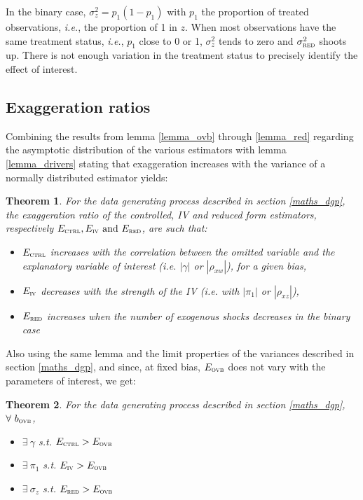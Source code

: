 \documentclass[usletter, 12pt]{article}
\newtheorem{theorem}{Theorem}
\begin{document}
				In the binary case, $\sigma_{z}^{2} = p_{1}(1-p_{1})$ with $p_{1}$ the proportion of treated observations, \textit{i.e.}, the proportion of 1 in $z$. When most observations have the same treatment status, \textit{i.e.}, $p_{1}$ close to 0 or 1, $\sigma_{z}^{2}$ tends to zero and $\sigma_{\textsc{red}}^{2}$ shoots up. There is not enough variation in the treatment status to precisely identify the effect of interest. 
				
		\subsection{Exaggeration ratios}
		
			Combining the results from lemma \ref{lemma_ovb} through \ref{lemma_red}  regarding the asymptotic distribution of the various estimators with lemma \ref{lemma_drivers} stating that exaggeration increases with the variance of a normally distributed estimator yields:
			~
			\begin{theorem}
				For the data generating process described in section \ref{maths_dgp}, the exaggeration ratio of the controlled, IV and reduced form estimators, respectively $E_{\textsc{ctrl}}, E_{\textsc{iv}} \text{ and } E_{\textsc{red}}$, are such that:
					\begin{itemize}
						\item $E_{\textsc{ctrl}}$ increases with the correlation between the omitted variable and the explanatory variable of interest (\textit{i.e.} $|\gamma|$ or $|\rho_{xw}|$), for a given bias,
						\item $E_{\textsc{iv}}$ decreases with the strength of the IV (\textit{i.e.} with $|\pi_{1}|$ or $|\rho_{xz}|$),
						\item $E_{\textsc{red}}$ increases when the number of exogenous shocks decreases in the binary case
					\end{itemize}
			\end{theorem}
			
			Also using the same lemma and the limit properties of the variances described in section \ref{maths_dgp}, and since, at fixed bias, $E_{\textsc{ovb}}$ does not vary with the parameters of interest, we get:
			~
			\begin{theorem}
				For the data generating process described in section \ref{maths_dgp}, $\forall \ b_{\textsc{ovb}}$,
					\begin{itemize}
						\item $\exists \ \gamma$ s.t. $E_{\textsc{ctrl}} > E_{\textsc{ovb}}$
						\item $\exists \ \pi_{1}$ s.t. $E_{\textsc{iv}} > E_{\textsc{ovb}}$
						\item $\exists \ \sigma_{z}$ s.t. $E_{\textsc{red}} > E_{\textsc{ovb}}$
					\end{itemize}
			\end{theorem}
			
\end{document}
